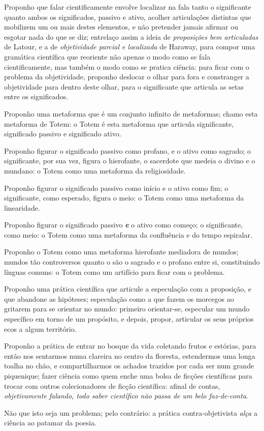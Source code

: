 Proponho que falar cientificamente envolve localizar na fala tanto o significante quanto ambos os significados, passivo e ativo, acolher articulações distintas que mobilizem um ou mais destes elementos, e não pretender jamais afirmar ou esgotar nada do que se diz;
    entrelaço assim a ideia de \textit{proposições bem articuladas} de Latour, e a de \textit{objetividade parcial e localizada} de Haraway, para compor uma gramática científica que reoriente não apenas o modo como se fala cientificamente, mas também o modo como se pratica ciência:
        para ficar com o problema da objetividade, proponho deslocar o olhar para fora e constranger a objetividade para dentro deste olhar, para o significante que articula as setas entre os significados.

Proponho uma metaforma que é um conjunto infinito de metaformas;
    chamo esta metaforma de Totem:
        o Totem é esta metaforma que articula significante, significado passivo e significado ativo.

Proponho figurar o significado passivo como profano, e o ativo como sagrado;
    o significante, por sua vez, figura o hierofante, o sacerdote que medeia o divino e o mundano:
        o Totem como uma metaforma da religiosidade.
    
Proponho figurar o significado passivo como início e o ativo como fim;
    o significante, como esperado, figura o meio:
        o Totem como uma metaforma da linearidade.
    
Proponho figurar o significado passivo \textit{\textbf{e}} o ativo como começo; 
    o significante, como meio:
        o Totem como uma metaforma da confluência e do tempo espiralar.

Proponho o Totem como uma metaforma hierofante mediadora de mundos;
    mundos tão controversos quanto o são o sagrado e o profano entre si, constituindo línguas comuns:
        o Totem como um artifício para ficar com o problema.

Proponho uma prática científica que articule a especulação com a proposição, e que abandone as hipóteses;
    especulação como a que fazem os morcegos ao gritarem para se orientar no mundo:
        primeiro orientar-se, especular um mundo específico em torno de um propósito, e depois, propor, articular os seus próprios ecos a algum território.

Proponho a prática de entrar no bosque da vida coletando frutos e estórias, para então nos sentarmos numa clareira no centro da floresta, estendermos uma longa toalha no chão, e compartilharmos os achados trazidos por cada ser num grande piquenique;
    fazer ciência como quem enche uma bolsa de ficções científicas para trocar com outros colecionadores de ficção científica:
        afinal de contas, \textit{objetivamente falando, todo saber científico não passa de um belo faz-de-conta}.
    
Não que isto seja um problema;
    pelo contrário:
        a prática contra-objetivista \textit{alça} a ciência ao patamar da poesia.

